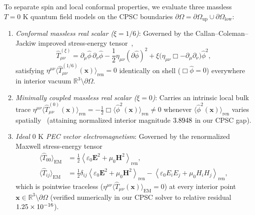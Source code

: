 \documentclass[aps,prd,twocolumn,10pt,showkeys,nofootinbib,floatfix,longbibliography]{revtex4-2}
\begin{document}
To separate spin and local conformal properties, we evaluate three massless $T = 0\text{ K}$ quantum field models on the CPSC boundaries $\partial\Omega = \partial\Omega_{\mathrm{up}} \cup \partial\Omega_{\mathrm{low}}$:
\begin{enumerate}
    \item \emph{Conformal massless real scalar ($\xi = 1/6$)}: Governed by the Callan--Coleman--Jackiw improved stress-energy tensor~\cite{callan1970,birrell1982},
    \begin{equation}
    \hat{T}_{\mu\nu}^{(\xi)} = \partial_\mu \hat{\phi}\,\partial_\nu \hat{\phi} - \frac{1}{2}\eta_{\mu\nu}(\partial\hat{\phi})^2 + \xi\bigl(\eta_{\mu\nu}\Box - \partial_\mu\partial_\nu\bigr)\hat{\phi}^2,
    \label{eq:scalar_tmunu}
    \end{equation}
    satisfying $\eta^{\mu\nu}\langle\hat{T}_{\mu\nu}^{(1/6)}(\mathbf{x})\rangle_{\mathrm{ren}} = 0$ identically on shell ($\Box\hat{\phi}=0$) everywhere in interior vacuum $\mathbb{R}^3 \setminus \partial\Omega$.
    \item \emph{Minimally coupled massless real scalar ($\xi = 0$)}: Carries an intrinsic local bulk trace $\eta^{\mu\nu}\langle \hat{T}_{\mu\nu}^{(0)}(\mathbf{x})\rangle_{\mathrm{ren}} = -\frac{1}{2}\Box\langle\hat{\phi}^2(\mathbf{x})\rangle_{\mathrm{ren}} \neq 0$ whenever $\langle\hat{\phi}^2(\mathbf{x})\rangle_{\mathrm{ren}}$ varies spatially~\cite{deutsch1979,milton2016} (attaining normalized interior magnitude $3.8948$ in our CPSC gap).
    \item \emph{Ideal $0\text{ K}$ PEC vector electromagnetism}: Governed by the renormalized Maxwell stress-energy tensor
    \begin{align}
    \langle \hat{T}_{00} \rangle_{\mathrm{EM}} &= \frac{1}{2}\left\langle \varepsilon_0 \mathbf{E}^2 + \mu_0 \mathbf{H}^2 \right\rangle_{\mathrm{ren}}, \nonumber\\
    \langle \hat{T}_{ij} \rangle_{\mathrm{EM}} &= \frac{1}{2}\delta_{ij}\left\langle \varepsilon_0 \mathbf{E}^2 + \mu_0 \mathbf{H}^2 \right\rangle_{\mathrm{ren}} - \left\langle \varepsilon_0 E_i E_j + \mu_0 H_i H_j \right\rangle_{\mathrm{ren}},
    \label{eq:maxwell_tmunu}
    \end{align}
    which is pointwise traceless ($\eta^{\mu\nu}\langle\hat{T}_{\mu\nu}(\mathbf{x})\rangle_{\mathrm{EM}} = 0$) at every interior point $\mathbf{x} \in \mathbb{R}^3 \setminus \partial\Omega$ (verified numerically in our CPSC solver to relative residual $1.25\times 10^{-16}$).
\end{enumerate}
\end{document}
